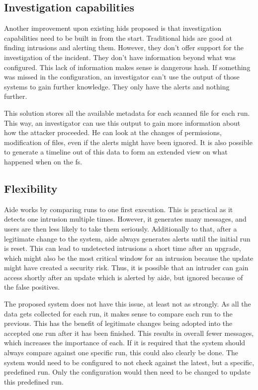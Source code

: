 \subsection{Investigation capabilities}
\label{sec:investigation:capabilities}
Another improvement upon existing \gls{hids} proposed is that investigation capabilities need to be built in from the start. Traditional \gls{hids} are good at finding intrusions and alerting them. However, they don't offer support for the investigation of the incident. They don't have information beyond what was configured. This lack of information makes sense is dangerous \gls{hash}. If something was missed in the configuration, an investigator can't use the output of those systems to gain further knowledge. They only have the alerts and nothing further.

This solution stores all the available \gls{metadata} for each scanned file for each run. This way, an investigator can use this output to gain more information about how the attacker proceeded. He can look at the changes of permissions, modification of files, even if the alerts might have been ignored. It is also possible to generate a timeline out of this data to form an extended view on what happened when on the \gls{fs}. 

\subsection{Flexibility}

Aide works by comparing runs to one first execution. This is practical as it detects one intrusion multiple times. However, it generates many messages, and users are then less likely to take them seriously. Additionally to that, after a legitimate change to the system, aide always generates alerts until the initial run is reset. This can lead to undetected intrusions a short time after an upgrade, which might also be the most critical window for an intrusion because the update might have created a security risk. Thus, it is possible that an intruder can gain access shortly after an update which is alerted by aide, but ignored because of the false positives.

The proposed system does not have this issue, at least not as strongly. As all the data gets collected for each run, it makes sense to compare each run to the previous. This has the benefit of legitimate changes being adopted into the accepted one run after it has been finished. This results in overall fewer messages, which increases the importance of each. If it is required that the system should always compare against one specific run, this could also clearly be done. The system would need to be configured to not check against the latest, but a specific, predefined run. Only the configuration would then need to be changed to update this predefined run. 


